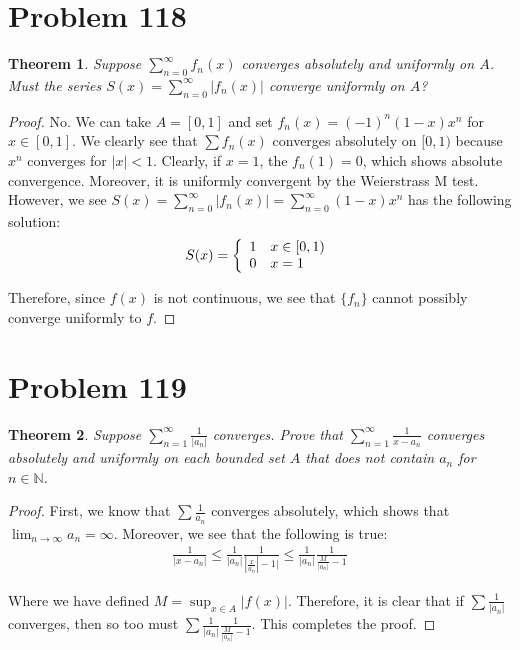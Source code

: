 \documentclass[psamsfonts]{amsart}
\newtheorem{thm}{Theorem}[section]
\theoremstyle{definition}
\theoremstyle{remark}
\numberwithin{equation}{section}
\begin{document}
\section{Problem 118}

\begin{thm}
Suppose $\sum_{n=0}^\infty f_n(x)$ converges absolutely and uniformly on $A$. Must the series $S(x) = \sum_{n=0}^\infty |f_n(x)|$ converge uniformly on $A$?
\end{thm}

\begin{proof}
No. We can take $A = [0,1]$ and set $f_n(x) = (-1)^n (1-x) x^n$ for $x \in [0,1]$. We clearly see that $\sum f_n(x)$ converges absolutely on $[0,1)$ because $x^n$ converges for $|x|<1$. Clearly, if $x=1$, the $f_n(1) = 0$, which shows absolute convergence. Moreover, it is uniformly convergent by the Weierstrass M test. However, we see $S(x) = \sum_{n=0}^\infty |f_n(x)| = \sum_{n=0}^\infty (1-x) x^n$ has the following solution:
\begin{eqnarray}
S(x) = \left\{ \begin{array}{l l }
1 & x \in [0,1) \\
0 & x = 1 
\end{array} \right.
\end{eqnarray}

Therefore, since $f(x)$ is not continuous, we see that $\{ f_n \}$ cannot possibly converge uniformly to $f$. 
\end{proof}

\section{Problem 119}

\begin{thm}
Suppose $\sum_{n=1}^\infty \frac{1}{|a_n|}$ converges. Prove that $\sum_{n=1}^\infty \frac{1}{x - a_n }$ converges absolutely and uniformly on each bounded set $A$ that does not contain $a_n$ for $n \in \mathbb{N}$.
\end{thm}

\begin{proof}
First, we know that $\sum \frac{1}{a_n}$ converges absolutely, which shows that $\lim_{n \to \infty} a_n = \infty$. Moreover, we see that the following is true:
\begin{eqnarray}
\frac{1}{|x-a_n|} \leq \frac{1}{|a_n|} \frac{1}{|\frac{x}{a_n}| - 1|} \leq \frac{1}{|a_n|} \frac{1}{\frac{M}{|a_n|} - 1}
\end{eqnarray}

Where we have defined $M = \sup_{x \in A} |f(x)|$. Therefore, it is clear that if $\sum \frac{1}{|a_n|}$ converges, then so too must $\sum \frac{1}{|a_n|}\frac{1}{\frac{M}{|a_n|}-1}$. This completes the proof.
\end{proof}
\end{document}
